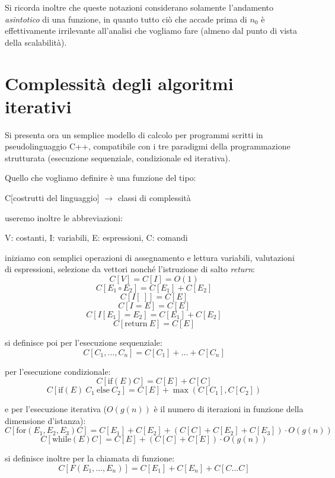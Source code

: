 \documentclass[a4paper,12pt]{article}
\begin{document}
Si ricorda inoltre che queste notazioni considerano solamente l'andamento \textit{asintotico} di una funzione,
in quanto tutto ciò che accade prima di $n_0$ è effettivamente irrilevante all'analisi che vogliamo fare (almeno
dal punto di vista della scalabilità).

\section{Complessità degli algoritmi iterativi}
Si presenta ora un semplice modello di calcolo per programmi scritti in pseudolinguaggio C++, compatibile
con i tre paradigmi della programmazione strutturata (esecuzione sequenziale, condizionale ed iterativa).
\par
Quello che vogliamo definire è una funzione del tipo:
\begin{center}
  C[costrutti del linguaggio] $\rightarrow$ classi di complessità
\end{center}
useremo inoltre le abbreviazioni:
\begin{center}
  V: costanti, I: variabili, E: espressioni, C: comandi
\end{center}

iniziamo con semplici operazioni di assegnamento e lettura variabili, valutazioni di espressioni, selezione
da vettori nonché l'istruzione di salto \textit{return}:
$$ C[V] = C[I] = O(1) $$
$$ C[E_1 \circ E_2] = C[E_1] + C[E_2] $$
$$ C[I[\:]] = C[E] $$
$$ C[I = E] = C[E] $$
$$ C[I[E_1] = E_2] = C[E_1] + C[E_2] $$
$$ C[\mathrm{return} \ E] = C[E] $$

si definisce poi per l'esecuzione sequenziale:
$$ C[{C_1,...,C_n}] = C[C_1] + ... + C[C_n] $$ 

per l'esecuzione condizionale:
$$ C[\mathrm{if}(E)C] = C[E] + C[C] $$
$$ C[\mathrm{if}(E) \: C_1 \: \mathrm{else} \: C_2] = C[E] + \max(C[C_1], C[C_2]) $$ 

e per l'esecuzione iterativa ($O(g(n))$ è il numero di iterazioni in funzione della dimensione d'istanza):
$$ C[\mathrm{for}(E_1, E_2, E_3)C] = C[E_1] + C[E_2] + (C[C] + C[E_2] + C[E_3]) \cdot O(g(n)) $$
$$ C[\mathrm{while}(E)C] = C[E] + (C[C] + C[E]) \cdot O(g(n)) $$

si definisce inoltre per la chiamata di funzione:
$$ C[F(E_1,...,E_n)] = C[E_1] + C[E_n] + C[{C...C}] $$
\end{document}
